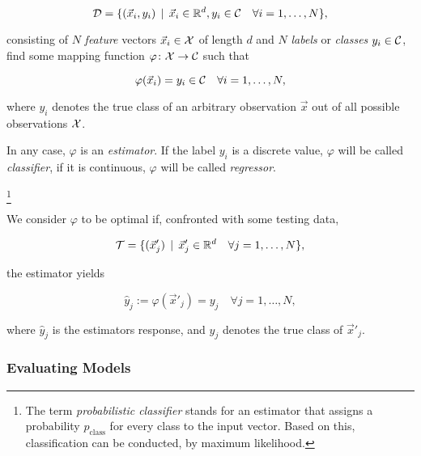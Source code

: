 \begin{equation}
\mathcal{D} = \{ (\vec x_i, y_i) \, \mid \, \vec x_i \in \mathbb{R}^d, y_i \in \mathcal{C} \quad \forall i = 1,\ldots,N \},
\end{equation}

consisting of $N$ \emph{feature} vectors $\vec x_i \in \mathcal{X}$ of length $d$ and $N$ \emph{labels} or \emph{classes} $y_i \in \mathcal{C}$, find some mapping function $\varphi \colon \mathcal{X} \to \mathcal{C}$ such that

\begin{equation}
\varphi(\vec x_i) = y_i \in \mathcal{C} \quad \forall i = 1,\ldots,N,
\end{equation}

where $y_i$ denotes the true class of an arbitrary observation $\vec x$ out of all possible observations $\mathcal{X}$.

\begin{definition}[Estimators]
In any case, $\varphi$ is an \emph{estimator}. If the label $y_i$ is a discrete value, $\varphi$ will be called \emph{classifier}, if it is continuous, $\varphi$ will be called \emph{regressor}.
\end{definition}\footnote{The term \emph{probabilistic classifier} stands for an estimator that assigns a probability $p_{\text{class}}$ for every class to the input vector. Based on this, classification can be conducted, \eg by maximum likelihood.}

We consider $\varphi$ to be optimal if, confronted with some testing data,

\begin{equation}
\mathcal{T} = \{ (\vec x'_j) \, \mid \, \vec x'_j \in \mathbb{R}^d \quad \forall j = 1,\ldots,N \},
\end{equation}

the estimator yields

\begin{equation}
\hat y_j := \varphi({\vec x'_j}) = y_j \quad \forall j = 1,\ldots,N,
\end{equation}

where $\hat y_j$ is the estimators response, and $y_j$ denotes the true class of $\vec x'_j$.

\subsubsection{Evaluating Models}


